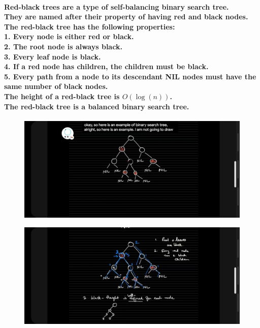 \documentclass{article}
\begin{document}
\paragraph{
    Red-black trees are a type of self-balancing binary search tree.\\
    They are named after their property of having red and black nodes.\\
    The red-black tree has the following properties:\\
    1. Every node is either red or black.\\
    2. The root node is always black.\\
    3. Every leaf node is black.\\
    4. If a red node has children, the children must be black.\\
    5. Every path from a node to its descendant NIL nodes must have the same number of black nodes.\\
    The height of a red-black tree is $O(\log(n))$.\\
    The red-black tree is a balanced binary search tree.\\
}

\begin{figure}[H]
    \includegraphics[width=\textwidth]{redblacktree.jpg}
\end{figure}

\begin{figure}[H]
    \includegraphics[width=\textwidth]{redblacktreesamenumberofblacknoderule.jpg}
\end{figure}
\end{document}
